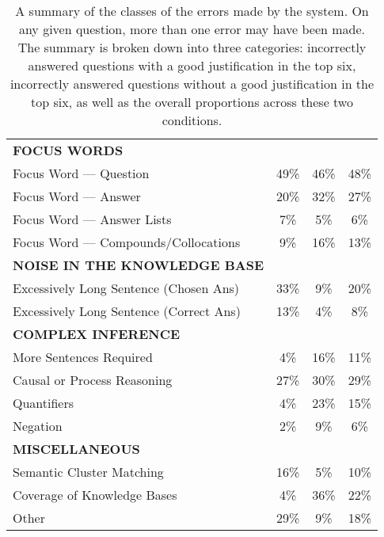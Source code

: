 \begin{table}[!tb]
\begin{center}
\begin{tabular}{lccc}
\hline
\textbf{FOCUS WORDS}  	& 		&		& 	\\
Focus Word --- Question 					& 	49\%		&	46\% 	& 	48\%	\\
Focus Word --- Answer 						& 	20\%		&	32\% 	& 	27\%	\\
Focus Word --- Answer Lists 				& 	7\%		&	5\%		& 	6\%	\\
Focus Word --- Compounds/Collocations 		& 	9\%		&	16\%		& 	13\%	\\
\hline
\textbf{NOISE IN THE KNOWLEDGE BASE}		& 			&			& 	\\
Excessively Long Sentence (Chosen Ans) 	& 	33\%		&	9\% 		& 	20\%	\\
Excessively Long Sentence (Correct Ans) 	& 	13\%		&	4\% 		& 	8\%	\\
\hline
\textbf{COMPLEX INFERENCE}				& 			&			& 	\\
More Sentences Required 					& 	4\%		&	16\% 	& 	11\%	\\
Causal or Process Reasoning 				& 	27\%		&	30\%		& 	29\%\\
Quantifiers	 							& 	4\%		&	23\% 	& 	15\%	\\
Negation	 								& 	2\%		&	9\% 		& 	6\%	\\
\hline
\textbf{MISCELLANEOUS}					& 			&			& 	\\
Semantic Cluster Matching				& 	16\%		&	5\%		& 	10\%\\
Coverage of Knowledge Bases				& 	4\%		&	36\%		& 	22\%\\
Other									& 	29\%		&	9\%		& 	18\%\\
\hline
\end{tabular}
\caption{{  A summary of the classes of the errors made by the system. On any given question, more than one error may have been made. The summary is broken down into three categories: incorrectly answered questions with a good justification in the top six, incorrectly answered questions without a good justification in the top six, as well as the overall proportions across these two conditions.}} 
\label{tab:errorclasses}
\end{center}
\end{table}

